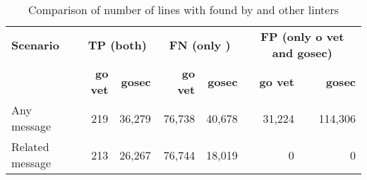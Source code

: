 \begin{table}[htp!]
    \centering
    \caption{Comparison of number of lines with \unsafe{} found by \toolGeiger{} and other linters}
    \label{tbl:go-geiger-evaluation-linters}
    \begin{tabular}{l|rr|rr|rr}
        \textbf{Scenario} & \multicolumn{2}{c|}{\textbf{TP (both)}} & \multicolumn{2}{c|}{\textbf{FN (only \toolGeiger{})}} & \multicolumn{2}{c}{\textbf{FP (only o vet and gosec)}} \\
        {}                & \textbf{go vet} & \textbf{gosec}        & \textbf{go vet} & \textbf{gosec}                      & \textbf{go vet} & \textbf{gosec}                       \\
        \hline
        Any message       & 219             & 36,279                & 76,738          & 40,678                              &  31,224         & 114,306                              \\
        Related message   & 213             & 26,267                & 76,744          & 18,019                              &       0         & 0                                    \\
    \end{tabular}
\end{table}